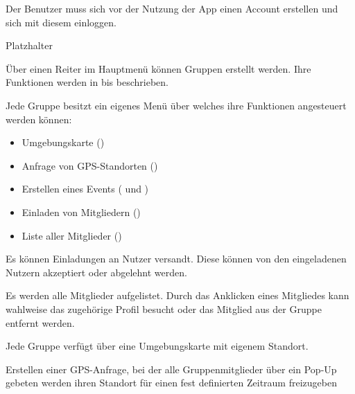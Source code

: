 \documentclass[parskip=full,11pt]{scrartcl}
\begin{document}
Der Benutzer muss sich vor der Nutzung der App einen Account erstellen und sich mit diesem einloggen.

Platzhalter %

Über einen Reiter im Hauptmenü können Gruppen erstellt werden.
Ihre Funktionen werden in  bis  beschrieben.

Jede Gruppe besitzt ein eigenes Menü über welches ihre Funktionen angesteuert werden können:
\begin{itemize}
    \item Umgebungskarte ()
    \item Anfrage von GPS-Standorten ()
    \item Erstellen eines Events ( und )
    \item Einladen von Mitgliedern ()
    \item Liste aller Mitglieder ()
\end{itemize}

Es können Einladungen an Nutzer versandt.
Diese können von den eingeladenen Nutzern akzeptiert oder abgelehnt werden.

Es werden alle Mitglieder aufgelistet.
Durch das Anklicken eines Mitgliedes kann wahlweise das zugehörige Profil besucht oder das Mitglied aus der Gruppe entfernt werden.

Jede Gruppe verfügt über eine Umgebungskarte mit eigenem Standort.

Erstellen einer GPS-Anfrage, bei der alle Gruppenmitglieder über ein Pop-Up gebeten werden ihren Standort für einen fest definierten Zeitraum freizugeben
\end{document}
